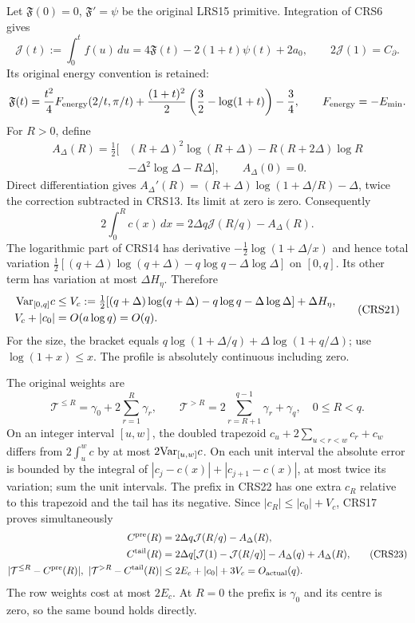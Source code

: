\documentclass[11pt,a4paper]{article}
\begin{document}
Let $\mathfrak F(0)=0$, $\mathfrak F'=\psi$ be the original LRS15
primitive. Integration of CRS6 gives
\[
 \mathcal J(t):=\int_0^t f(u)\,du
 =4\mathfrak F(t)-2(1+t)\psi(t)+2a_0,\qquad
 2\mathcal J(1)=C_\partial.                            \tag{CRS18}
\]
Its original energy convention is retained:
\[
 \mathfrak F(t)=\frac{t^2}{4}F_{\rm energy}(2/t,\pi/t)
 +\frac{(1+t)^2}{2}\left(\frac32-\log(1+t)\right)-\frac34,
 \qquad F_{\rm energy}=-E_{\min}.
\]
For $R>0$, define
\[
\begin{split}
 A_\Delta(R)=\tfrac12[&(R+\Delta)^2\log(R+\Delta)
       -R(R+2\Delta)\log R\\
       &-\Delta^2\log\Delta-R\Delta],\qquad A_\Delta(0)=0 .
\end{split}                                                    \tag{CRS19}
\]
Direct differentiation gives
$A_\Delta'(R)=(R+\Delta)\log(1+\Delta/R)-\Delta$,
twice the correction subtracted in CRS13. Its limit at zero is zero.
Consequently
\[
 2\int_0^R c(x)\,dx=2\Delta q\mathcal J(R/q)-A_\Delta(R).
                                                               \tag{CRS20}
\]
The logarithmic part of CRS14 has derivative
$-\tfrac12\log(1+\Delta/x)$ and hence total variation
$\tfrac12[(q+\Delta)\log(q+\Delta)-q\log q-\Delta\log\Delta]$
on $[0,q]$. Its other term has variation at most $\Delta H_\eta$.
Therefore
\[
\begin{split}
 {\rm Var}_{[0,q]}c&\le V_c
 :=\tfrac12[(q+\Delta)\log(q+\Delta)-q\log q-\Delta\log\Delta]
                                    +\Delta H_\eta,\\
 V_c+|c_0|&=O(a\log q)=O(q).
\end{split}                                                    \tag{CRS21}
\]
For the size, the bracket equals
$q\log(1+\Delta/q)+\Delta\log(1+q/\Delta)$; use
$\log(1+x)\le x$. The profile is absolutely continuous including zero.

The original weights are
\[
 \mathcal T^{\le R}=\gamma_0+2\sum_{r=1}^R\gamma_r,\qquad
 \mathcal T^{>R}=2\sum_{r=R+1}^{q-1}\gamma_r+\gamma_q,\quad 0\le R<q .
                                                               \tag{CRS22}
\]
On an integer interval $[u,w]$, the doubled trapezoid
$c_u+2\sum_{u<r<w}c_r+c_w$ differs from $2\int_u^w c$
by at most $2{\rm Var}_{[u,w]}c$. On each unit interval the
absolute error is bounded by the integral of
$|c_j-c(x)|+|c_{j+1}-c(x)|$, at most twice its variation;
sum the unit intervals. The prefix in CRS22 has one extra
$c_R$ relative to this trapezoid and the tail has its negative.
Since $|c_R|\le|c_0|+V_c$, CRS17 proves simultaneously
\[
\begin{split}
 C^{\rm pre}(R)&=2\Delta q\mathcal J(R/q)-A_\Delta(R),\\
 C^{\rm tail}(R)&=2\Delta q[\mathcal J(1)-\mathcal J(R/q)]
                                    -A_\Delta(q)+A_\Delta(R),\\
 |\mathcal T^{\le R}-C^{\rm pre}(R)|,\
 |\mathcal T^{>R}-C^{\rm tail}(R)|
 &\le2E_c+|c_0|+3V_c=O_{\rm actual}(q).
\end{split}                                                    \tag{CRS23}
\]
The row weights cost at most $2E_c$. At $R=0$ the prefix is
$\gamma_0$ and its centre is zero, so the same bound holds directly.
\end{document}
